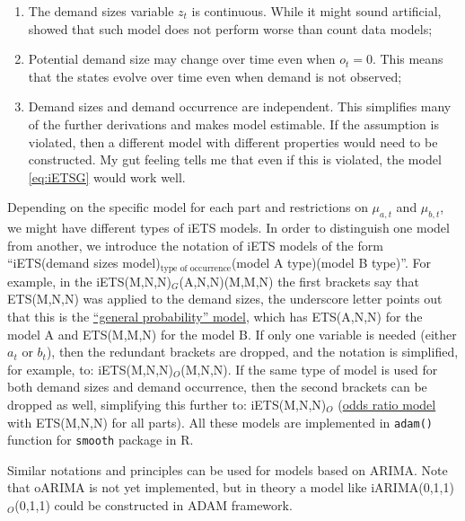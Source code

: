 \documentclass[
]{book}
\providecommand{\tightlist}{%
  \setlength{\itemsep}{0pt}\setlength{\parskip}{0pt}}
\theoremstyle{definition}
\theoremstyle{definition}
\theoremstyle{definition}
\theoremstyle{definition}
\theoremstyle{remark}
\begin{document}
\begin{enumerate}
\def\labelenumi{\arabic{enumi}.}
\tightlist
\item
  The demand sizes variable \(z_t\) is continuous. While it might sound artificial, \citet{Svetunkov2019a} showed that such model does not perform worse than count data models;
\item
  Potential demand size may change over time even when \(o_t=0\). This means that the states evolve over time even when demand is not observed;
\item
  Demand sizes and demand occurrence are independent. This simplifies many of the further derivations and makes model estimable. If the assumption is violated, then a different model with different properties would need to be constructed. My gut feeling tells me that even if this is violated, the model \eqref{eq:iETSG} would work well.
\end{enumerate}

Depending on the specific model for each part and restrictions on \(\mu_{a,t}\) and \(\mu_{b,t}\), we might have different types of iETS models. In order to distinguish one model from another, we introduce the notation of iETS models of the form ``iETS(demand sizes model)\(_\text{type of occurrence}\)(model A type)(model B type)''. For example, in the iETS(M,N,N)\(_G\)(A,N,N)(M,M,N) the first brackets say that ETS(M,N,N) was applied to the demand sizes, the underscore letter points out that this is the \protect\hyperlink{oETSG}{``general probability'' model}, which has ETS(A,N,N) for the model A and ETS(M,M,N) for the model B. If only one variable is needed (either \(a_t\) or \(b_t\)), then the redundant brackets are dropped, and the notation is simplified, for example, to: iETS(M,N,N)\(_O\)(M,N,N). If the same type of model is used for both demand sizes and demand occurrence, then the second brackets can be dropped as well, simplifying this further to: iETS(M,N,N)\(_O\) (\protect\hyperlink{oETSO}{odds ratio model} with ETS(M,N,N) for all parts). All these models are implemented in \texttt{adam()} function for \texttt{smooth} package in R.

Similar notations and principles can be used for models based on ARIMA. Note that oARIMA is not yet implemented, but in theory a model like iARIMA(0,1,1)\(_O\)(0,1,1) could be constructed in ADAM framework.
\end{document}
